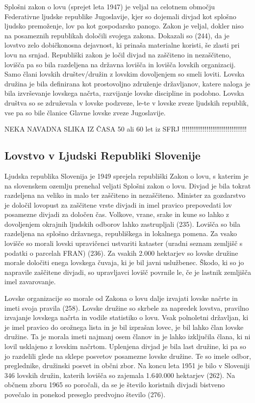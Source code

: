 \documentclass[a4paper,12pt,openright]{book}
\begin{document}
Splošni zakon o lovu (sprejet leta 1947) je veljal na celotnem območju Federativne ljudske republike Jugoslavije, kjer so dojemali divjad kot splošno ljudsko premoženje, lov pa kot gospodarsko panogo. 
Zakon je veljal, dokler niso na posameznih republikah določili svojega zakona.
Dokazali so (244), da je lovstvo zelo dobičkonosna dejavnost, ki prinaša materialne koristi, še zlasti pri lovu na srnjad.
Republiški zakon je ločil divjad na zaščiteno in nezaščiteno, lovišča pa so bila razdeljena na državna lovišča in lovišča lovskih organizacij.
Samo člani lovskih društev/družin z lovskim dovoljenjem so smeli loviti. 
Lovska družina je bila definirana kot prostovoljno združenje državljanov, katere naloga je bila izvrševanje lovskega načrta, razvijanje lovske discipline in podobno. 
Lovska društva so se združevala v lovske podzveze, le-te v lovske zveze ljudskih republik, vse pa so bile članice Glavne lovske zveze Jugoslavije.

NEKA NAVADNA SLIKA IZ ČASA 50 ali 60 let iz SFRJ !!!!!!!!!!!!!!!!!!!!!!!!!!!!!!!!!!

\subsection{Lovstvo v Ljudski Republiki Slovenije}

Ljudska republika Slovenija je 1949 sprejela republiški Zakon o lovu, s katerim je na slovenskem ozemlju prenehal veljati Splošni zakon o lovu.
Divjad je bila tokrat razdeljena na veliko in malo ter zaščiteno in nezaščiteno. 
Minister za gozdarstvo je določil lovopust za zaščitene vrste divjadi in imel pravico prepovedati lov posamezne divjadi za določen čas. 
Volkove, vrane, srake in kune so lahko z dovoljenjem okrajnih ljudskih odborov lahko zastrupljali (235).
Lovišča so bila razdeljena na splošno državnega, republiškega in lokalnega pomena. 
Za vsako lovišče so morali lovski upravičenci ustvariti kataster (uradni seznam zemljišč s podatki o parcelah FRAN) (236). 
Za vsakih 2.000 hektarjev so lovske družine morale določiti enega lovskega čuvaja, ki je bil javni uslužbenec. 
Škodo, ki so jo napravile zaščitene divjadi, so upravljavci lovišč povrnile le, če je lastnik zemljišča imel zavarovanje.  

Lovske organizacije so morale od Zakona o lovu dalje izvajati lovske načrte in imeti svoja pravila (258). 
Lovske družine so skrbele za napredek lovstva, pravilno izvajanje lovskega načrta in vodile statistiko o lovu. 
Vsak polnoletni državljan, ki je imel pravico do orožnega lista in je bil izprašan lovec, je bil lahko član lovske družine. 
Ta je morala imeti najmanj osem članov in je lahko izključila člana, ki ni lovil usklajeno z lovskim načrtom. 
Uplenjena divjad je bila last družine, ki pa so jo razdelili glede na sklepe posvetov posamezne lovske družine. 
Te so imele odbor, preglednike, družinski posvet in občni zbor. 
Na koncu leta 1951 je bilo v Sloveniji 346 lovskih družin, katerih lovišča so zajemala 1.640.000 hektarjev (262).
Na občnem zboru 1965 so poročali, da se je število koristnih divjadi bistveno povečalo in ponekod preseglo predvojno število (276).
\end{document}
